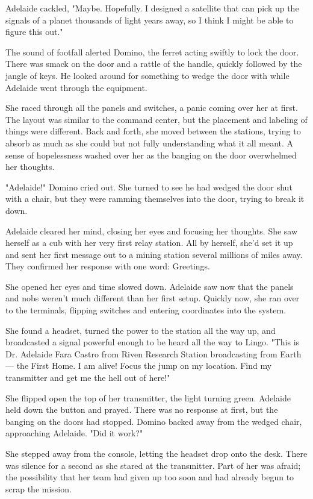 Adelaide cackled, "Maybe. Hopefully. I designed a satellite that can pick up the signals of a planet thousands of light years away, so I think I might be able to figure this out."

The sound of footfall alerted Domino, the ferret acting swiftly to lock the door. There was smack on the door and a rattle of the handle, quickly followed by the jangle of keys. He looked around for something to wedge the door with while Adelaide went through the equipment.

She raced through all the panels and switches, a panic coming over her at first. The layout was similar to the command center, but the placement and labeling of things were different. Back and forth, she moved between the stations, trying to absorb as much as she could but not fully understanding what it all meant. A sense of hopelessness washed over her as the banging on the door overwhelmed her thoughts.

"Adelaide!" Domino cried out. She turned to see he had wedged the door shut with a chair, but they were ramming themselves into the door, trying to break it down.

Adelaide cleared her mind, closing her eyes and focusing her thoughts. She saw herself as a cub with her very first relay station. All by herself, she'd set it up and sent her first message out to a mining station several millions of miles away. They confirmed her response with one word: Greetings.

She opened her eyes and time slowed down. Adelaide saw now that the panels and nobs weren't much different than her first setup. Quickly now, she ran over to the terminals, flipping switches and entering coordinates into the system.

She found a headset, turned the power to the station all the way up, and broadcasted a signal powerful enough to be heard all the way to Lingo. "This is Dr. Adelaide Fara Castro from Riven Research Station broadcasting from Earth--- the First Home. I am alive! Focus the jump on my location. Find my transmitter and get me the hell out of here!"

She flipped open the top of her transmitter, the light turning green. Adelaide held down the button and prayed. There was no response at first, but the banging on the doors had stopped. Domino backed away from the wedged chair, approaching Adelaide. "Did it work?"

She stepped away from the console, letting the headset drop onto the desk. There was silence for a second as she stared at the transmitter. Part of her was afraid; the possibility that her team had given up too soon and had already begun to scrap the mission.


